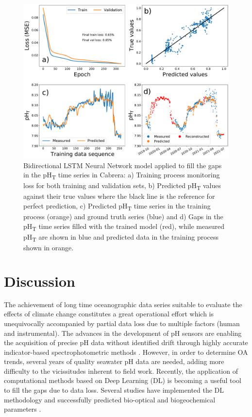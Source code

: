\begin{figure}[H]
    \centering

    \includegraphics[width=\textwidth]{Figures/bidirectional_LSTM_gap_filling.pdf}
    \caption[Deep learning model applied to fill the
        gaps in the pH\textsubscript{T} time series in Cabrera]{Bidirectional
        LSTM
        Neural Network model applied to fill the
        gaps in the pH\textsubscript{T} time series in Cabrera: a) Training
        process
        monitoring loss for both training and validation sets, b) Predicted
        pH\textsubscript{T} values against their true values where the black
        line is
        the reference for perfect prediction, c) Predicted pH\textsubscript{T}
        time
        series in the training process (orange) and ground truth series (blue)
        and d)
        Gaps in the pH\textsubscript{T} time series filled with the trained
        model
        (red), while measured pH\textsubscript{T} are shown in blue and
        predicted data
        in the training process shown in orange.}
    \label{fig:Cabrera_gap_filling}
\end{figure}

\section{Discussion}
The achievement of long time oceanographic data series suitable to evaluate
the effects of climate change constitutes a great operational effort which is
unequivocally accompanied by partial data loss due to multiple factors (human
and instrumental). The advances in the development of pH sensors are enabling
the acquisition of precise pH data without identified drift through highly
accurate indicator-based spectrophotometric methods \cite{seidel2008sensor}.
However, in order to determine OA trends, several years of quality seawater pH
data are needed, adding more difficulty to the vicissitudes inherent to field
work. Recently, the application of computational methods based on Deep Learning
(DL) is becoming a useful tool to fill the gaps due to data loss. Several
studies have implemented the DL methodology and successfully predicted
bio-optical and biogeochemical parameters
\cite{Bittig2018,Broullon2019,Broullon2021,Contractor2021,gregor2019comparative,lefevre2005comparison,Li2020nn,sauzede2017estimates,velo2013total}.

